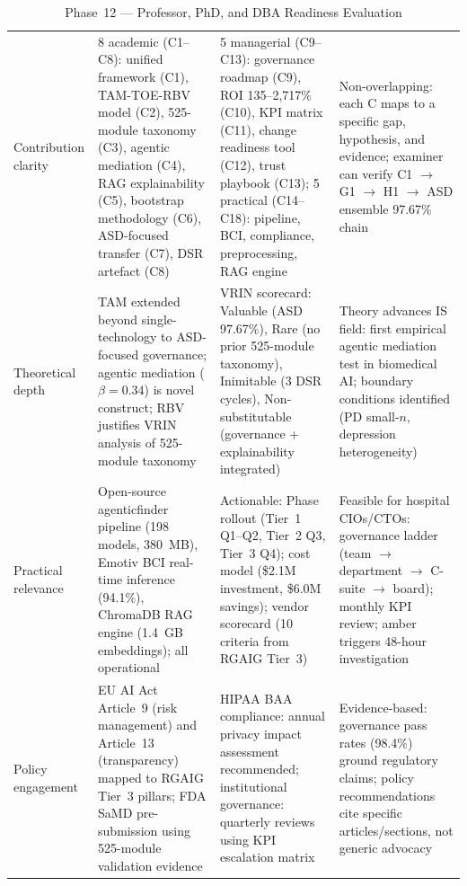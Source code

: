 \begingroup\singlespacing\tablefontsize\tablestripes
\begin{xltabular}{\textwidth}{@{} l X X X @{}}
\caption{Phase~12 --- Professor, PhD, and DBA Readiness Evaluation}
\label{tab:phase12_readiness}\\
\toprule
{} &  &  &  \\
\midrule
\endfirsthead
\endhead
\bottomrule
\endlastfoot
Contribution clarity       & 8 academic (C1--C8): unified framework (C1), TAM-TOE-RBV model (C2), 525-module taxonomy (C3), agentic mediation (C4), RAG explainability (C5), bootstrap methodology (C6), ASD-focused transfer (C7), DSR artefact (C8) & 5 managerial (C9--C13): governance roadmap (C9), ROI 135--2{,}717\% (C10), KPI matrix (C11), change readiness tool (C12), trust playbook (C13); 5 practical (C14--C18): pipeline, BCI, compliance, preprocessing, RAG engine & Non-overlapping: each C maps to a specific gap, hypothesis, and evidence; examiner can verify C1 $\rightarrow$ G1 $\rightarrow$ H1 $\rightarrow$ ASD ensemble 97.67\% chain \\
\addlinespace
Theoretical depth          & TAM extended beyond single-technology to ASD-focused governance; agentic mediation ($\beta = 0.34$) is novel construct; RBV justifies VRIN analysis of 525-module taxonomy & VRIN scorecard: Valuable (ASD 97.67\%), Rare (no prior 525-module taxonomy), Inimitable (3 DSR cycles), Non-substitutable (governance + explainability integrated) & Theory advances IS field: first empirical agentic mediation test in biomedical AI; boundary conditions identified (PD small-$n$, depression heterogeneity) \\
\addlinespace
Practical relevance        & Open-source agenticfinder pipeline (198 models, 380~MB), Emotiv BCI real-time inference (94.1\%), ChromaDB RAG engine (1.4~GB embeddings); all operational & Actionable: Phase rollout (Tier~1 Q1--Q2, Tier~2 Q3, Tier~3 Q4); cost model (\$2.1M investment, \$6.0M savings); vendor scorecard (10 criteria from RGAIG Tier~3) & Feasible for hospital CIOs/CTOs: governance ladder (team $\rightarrow$ department $\rightarrow$ C-suite $\rightarrow$ board); monthly KPI review; amber triggers 48-hour investigation \\
\addlinespace
Policy engagement          & EU AI Act Article~9 (risk management) and Article~13 (transparency) mapped to RGAIG Tier~3 pillars; FDA SaMD pre-submission using 525-module validation evidence & HIPAA BAA compliance: annual privacy impact assessment recommended; institutional governance: quarterly reviews using KPI escalation matrix & Evidence-based: governance pass rates (98.4\%) ground regulatory claims; policy recommendations cite specific articles/sections, not generic advocacy \\

\end{xltabular}
